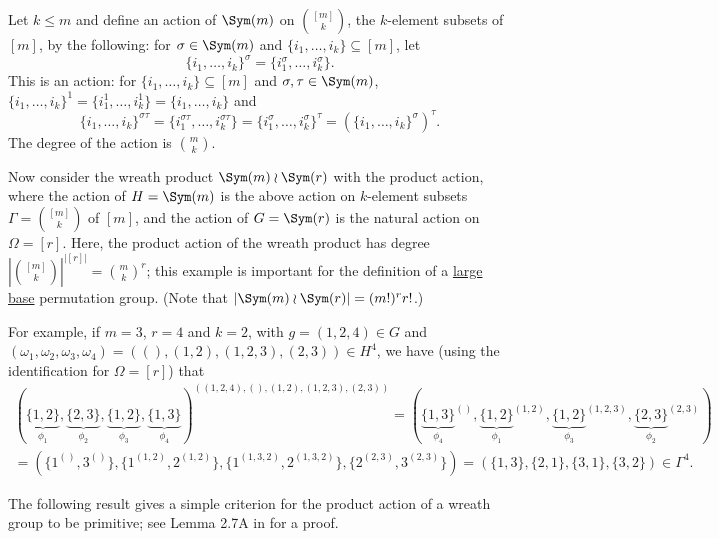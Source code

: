 \begin{example}\label{eg:product_action_Sm_subsets}
    Let $k \leq m$ and define an action of $\Sym(m)$ on $\binom{[m]}{k}$, the $k$-element subsets of $[m]$, by the following: for $\sigma \in \Sym(m)$ and $\{i_1,\dotsc,i_k\} \subseteq [m]$, let
    $$\{i_1,\dotsc,i_k\}^\sigma = \{i_1^\sigma,\dotsc,i_k^\sigma\}.$$
    This is an action: for $\{i_1,\dotsc,i_k\} \subseteq [m]$ and $\sigma,\tau \in \Sym(m)$, $\{i_1,\dotsc,i_k\}^1 = \{i_1^1,\dotsc,i_k^1\} = \{i_1,\dotsc,i_k\}$ and
    $$\{i_1,\dotsc,i_k\}^{\sigma\tau} = \{i_1^{\sigma\tau},\dotsc,i_k^{\sigma\tau}\} = \{i_1^\sigma,\dotsc,i_k^\sigma\}^\tau = (\{i_1,\dotsc,i_k\}^\sigma)^\tau.$$
    The degree of the action is $\binom{m}{k}$.

    Now consider the wreath product $\Sym(m) \wr \Sym(r)$ with the product action, where the action of $H = \Sym(m)$ is the above action on $k$-element subsets $\Gamma = \binom{[m]}{k}$ of $[m]$, and the action of $G = \Sym(r)$ is the natural action on $\Omega = [r]$. Here, the product action of the wreath product has degree $|\binom{[m]}{k}|^{|[r]|} = \binom{m}{k}^r$; this example is important for the definition of a \hyperref[def:large_base]{large base} permutation group. (Note that $|\Sym(m) \wr \Sym(r)| = (m!)^r r!$.)

    For example, if $m = 3$, $r = 4$ and $k = 2$, with $g = (1,2,4) \in G$ and $(\omega_1,\omega_2,\omega_3,\omega_4) = ((),(1,2),(1,2,3),(2,3)) \in H^4$, we have (using the identification for $\Omega = [r]$) that
    \begin{multline*}
        (\underbrace{\{1,2\}}_{\phi_1},\underbrace{\{2,3\}}_{\phi_2},\underbrace{\{1,2\}}_{\phi_3},\underbrace{\{1,3\}}_{\phi_4})^{((1,2,4),(),(1,2),(1,2,3),(2,3))} = ({\underbrace{\{1,3\}}_{\phi_4}}^{()},{\underbrace{\{1,2\}}_{\phi_1}}^{(1,2)},{\underbrace{\{1,2\}}_{\phi_3}}^{(1,2,3)},{\underbrace{\{2,3\}}_{\phi_2}}^{(2,3)}) \\
        = (\{1^{()},3^{()}\},\{1^{(1,2)},2^{(1,2)}\},\{1^{(1,3,2)},2^{(1,3,2)}\},\{2^{(2,3)},3^{(2,3)}\}) = (\{1,3\},\{2,1\},\{3,1\},\{3,2\}) \in \Gamma^4.
    \end{multline*}
\end{example}


The following result gives a simple criterion for the product action of a wreath group to be primitive; see Lemma 2.7A in \cite{dixon_mortimer_perm_groups1996} for a proof.

